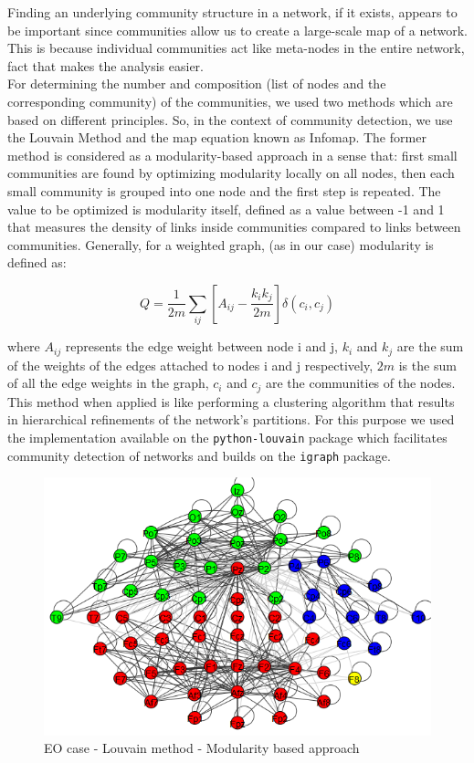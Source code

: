 \documentclass[%
 aip,
 jmp,%
 amsmath,amssymb,
 reprint,%
]{revtex4-1}
\begin{document}
Finding an underlying community structure in a network, if it exists, appears to be important since communities allow us to create a large-scale map of a network. This is because individual communities act like meta-nodes in the entire network, fact that makes the analysis easier\cite{wikiCommu}. \\

For determining the number and composition (list of nodes and the corresponding community) of the communities, we used two methods which are based on different principles. So, in the context of community detection, we use the Louvain Method and the map equation known as Infomap. The former method is considered as a modularity-based approach in a sense that: first small communities are found by optimizing modularity locally on all nodes, then each small community is grouped into one node and the first step is repeated. The value to be optimized is modularity itself, defined as a value between -1 and 1 that measures the density of links inside communities compared to links between communities. Generally, for a weighted graph, (as in our case) modularity is defined as:

\begin{equation}
	Q = \frac{1}{2m} \sum_{ij} \left[ A_{ij} - \frac{k_i k_j}{2m} \right] \delta(c_i, c_j)
\end{equation}

where $ A_{ij} $ represents the edge weight between node i and j, $ k_i $ and $ k_j $ are the sum of the weights of the edges attached to nodes i and j respectively, $ 2m $ is the sum of all the edge weights in the graph, $ c_i $ and $ c_j $ are the communities of the nodes.\\

This method when applied is like performing a clustering algorithm that results in hierarchical refinements of the network's partitions. For this purpose we used the implementation available on the \verb|python-louvain| package which facilitates community detection of networks and builds on the \verb|igraph| package\cite{wikiLouv}.

\begin{figure}
	\centering
	\includegraphics[width=0.7\linewidth]{../liouvain_open}
	\caption{EO case - Louvain method - Modularity based approach}
	\label{fig:liouvainopen}
\end{figure}
\end{document}

